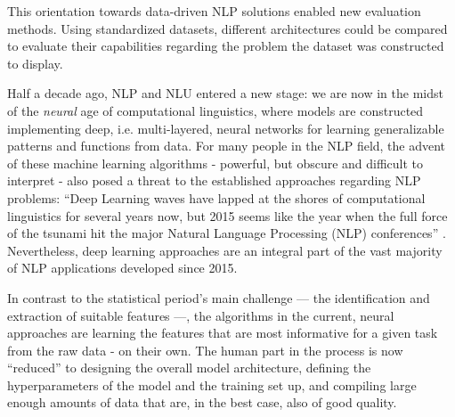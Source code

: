 
This orientation towards data-driven NLP solutions enabled new evaluation methods.
Using standardized datasets, different architectures could be compared to evaluate
their capabilities regarding the problem the dataset was constructed to display.

Half a decade ago, NLP and NLU entered a new stage: we are
now in the midst of the \emph{neural} age of computational
linguistics, where models are constructed implementing
deep, i.e. multi-layered, neural networks for learning
generalizable patterns and functions from data. For many
people in the NLP field, the advent of these machine learning
algorithms - powerful, but obscure and difficult to interpret
- also posed a threat to the established approaches regarding
NLP problems: ``Deep Learning waves have lapped at the shores
of computational linguistics for several years now, but 2015
seems like the year when the full force of the tsunami hit
the major Natural Language Processing (NLP) conferences''
\citep[p.~701]{manning2015computational}. Nevertheless, deep
learning approaches are an integral part of the vast majority
of NLP applications developed since 2015.

In contrast to the statistical period's main challenge --- the identification
and extraction of suitable features ---, the algorithms in the current, neural
approaches are learning the features that are most informative for a given task
from the raw data - on their own. The human part in the
process is now ``reduced'' to designing the overall model architecture, defining the
hyperparameters of the model and the training set up, and compiling large enough
amounts of data that are, in the best case, also of good quality.

